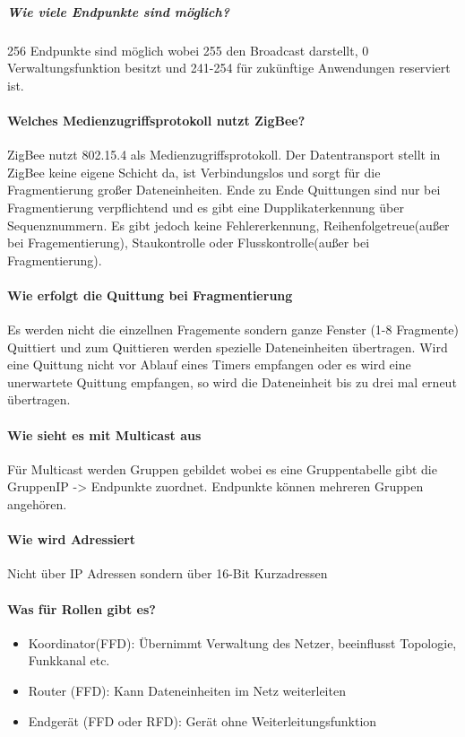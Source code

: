 	\subparagraph{Wie viele Endpunkte sind möglich?}
	256 Endpunkte sind möglich wobei 255 den Broadcast darstellt, 0 Verwaltungsfunktion besitzt und 241-254 für zukünftige Anwendungen reserviert ist.
	
	\paragraph{Welches Medienzugriffsprotokoll nutzt ZigBee?}
	ZigBee nutzt 802.15.4 als Medienzugriffsprotokoll.
	Der Datentransport stellt in ZigBee keine eigene Schicht da, ist Verbindungslos und sorgt für die Fragmentierung großer Dateneinheiten. Ende zu Ende Quittungen sind nur bei Fragmentierung verpflichtend und es gibt eine Dupplikaterkennung über Sequenznummern. Es gibt jedoch keine Fehlererkennung, Reihenfolgetreue(außer bei Fragementierung), Staukontrolle oder Flusskontrolle(außer bei Fragmentierung).
	
	\paragraph{Wie erfolgt die Quittung bei Fragmentierung}
	Es werden nicht die einzellnen Fragemente sondern ganze Fenster (1-8 Fragmente) Quittiert und zum Quittieren werden spezielle Dateneinheiten übertragen.
	Wird eine Quittung nicht vor Ablauf eines Timers empfangen oder es wird eine unerwartete Quittung empfangen, so wird die Dateneinheit bis zu drei mal erneut übertragen.
	
	\paragraph{Wie sieht es mit Multicast aus}
	Für Multicast werden Gruppen gebildet wobei es eine Gruppentabelle gibt die GruppenIP -> Endpunkte zuordnet. Endpunkte können mehreren Gruppen angehören.
	
	\paragraph{Wie wird Adressiert}
	Nicht über IP Adressen sondern über 16-Bit Kurzadressen
	
	\paragraph{Was für Rollen gibt es?}
	\begin{itemize}
		\item Koordinator(FFD): Übernimmt Verwaltung des Netzer, beeinflusst Topologie, Funkkanal etc.
		\item 	Router (FFD): Kann Dateneinheiten im Netz weiterleiten
		\item Endgerät (FFD oder RFD): Gerät ohne Weiterleitungsfunktion
	
	\end{itemize}
	
